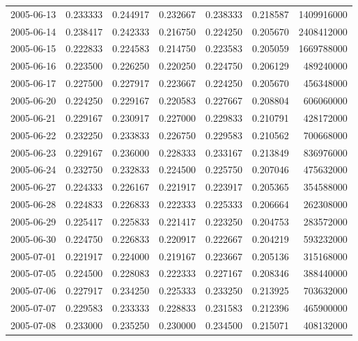 \begin{tabular}{lrrrrrr}
2005-06-13 &    0.233333 &    0.244917 &    0.232667 &    0.238333 &    0.218587 &  1409916000 \\
2005-06-14 &    0.238417 &    0.242333 &    0.216750 &    0.224250 &    0.205670 &  2408412000 \\
2005-06-15 &    0.222833 &    0.224583 &    0.214750 &    0.223583 &    0.205059 &  1669788000 \\
2005-06-16 &    0.223500 &    0.226250 &    0.220250 &    0.224750 &    0.206129 &   489240000 \\
2005-06-17 &    0.227500 &    0.227917 &    0.223667 &    0.224250 &    0.205670 &   456348000 \\
2005-06-20 &    0.224250 &    0.229167 &    0.220583 &    0.227667 &    0.208804 &   606060000 \\
2005-06-21 &    0.229167 &    0.230917 &    0.227000 &    0.229833 &    0.210791 &   428172000 \\
2005-06-22 &    0.232250 &    0.233833 &    0.226750 &    0.229583 &    0.210562 &   700668000 \\
2005-06-23 &    0.229167 &    0.236000 &    0.228333 &    0.233167 &    0.213849 &   836976000 \\
2005-06-24 &    0.232750 &    0.232833 &    0.224500 &    0.225750 &    0.207046 &   475632000 \\
2005-06-27 &    0.224333 &    0.226167 &    0.221917 &    0.223917 &    0.205365 &   354588000 \\
2005-06-28 &    0.224833 &    0.226833 &    0.222333 &    0.225333 &    0.206664 &   262308000 \\
2005-06-29 &    0.225417 &    0.225833 &    0.221417 &    0.223250 &    0.204753 &   283572000 \\
2005-06-30 &    0.224750 &    0.226833 &    0.220917 &    0.222667 &    0.204219 &   593232000 \\
2005-07-01 &    0.221917 &    0.224000 &    0.219167 &    0.223667 &    0.205136 &   315168000 \\
2005-07-05 &    0.224500 &    0.228083 &    0.222333 &    0.227167 &    0.208346 &   388440000 \\
2005-07-06 &    0.227917 &    0.234250 &    0.225333 &    0.233250 &    0.213925 &   703632000 \\
2005-07-07 &    0.229583 &    0.233333 &    0.228833 &    0.231583 &    0.212396 &   465900000 \\
2005-07-08 &    0.233000 &    0.235250 &    0.230000 &    0.234500 &    0.215071 &   408132000 \\

\end{tabular}
